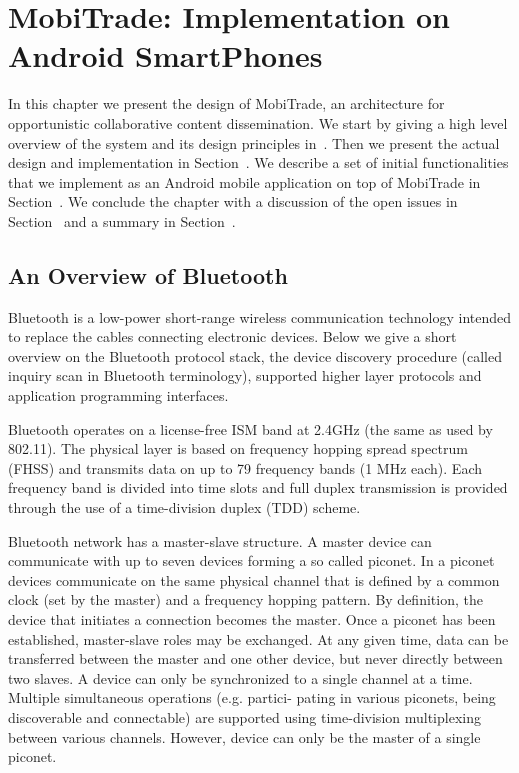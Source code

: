 \chapter{MobiTrade: Implementation on Android SmartPhones}
\label{chapter:MobiTrade}
\minitoc

In this chapter we present the design of MobiTrade, an architecture for opportunistic
collaborative content dissemination. We start by giving a high level overview of the system
and its design principles in~\cite{}. Then we present the actual design and implementation
in Section~\cite{}. We describe a set of initial functionalities that we implement as an Android mobile application on top
of MobiTrade in Section~\cite{}. We conclude the chapter with a discussion of the open issues in
Section~\cite{} and a summary in Section~\cite{}.

\section{An Overview of Bluetooth}
Bluetooth is a low-power short-range wireless communication technology intended to replace the cables connecting electronic devices. Below we give a short 
overview on the Bluetooth protocol stack, the device discovery procedure (called inquiry scan in Bluetooth terminology), supported higher 
layer protocols and application programming interfaces.

Bluetooth operates on a license-free ISM band at 2.4GHz (the same as used by 802.11). The physical layer is based on frequency hopping spread spectrum (FHSS)
and transmits data on up to 79 frequency bands (1 MHz each). Each frequency band is divided into time slots and full duplex transmission is provided through the use of
a time-division duplex (TDD) scheme.

Bluetooth network has a master-slave structure. A master device can communicate with up to seven devices forming a so called piconet. In a piconet devices communicate
on the same physical channel that is defined by a common clock (set by the master) and a frequency hopping pattern. By definition, the device that initiates a connection
becomes the master. Once a piconet has been established, master-slave roles may be exchanged. At any given time, data can be transferred between the master and one
other device, but never directly between two slaves. A device can only be synchronized to a single channel at a time. Multiple simultaneous operations (e.g. partici-
pating in various piconets, being discoverable and connectable) are supported using time-division multiplexing between various channels. However, device can only be
the master of a single piconet.

